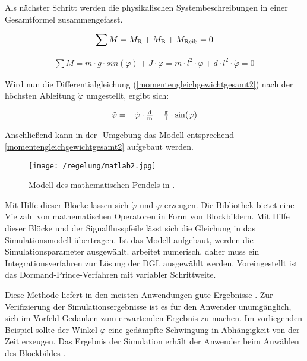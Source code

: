 Als nächster Schritt werden die physikalischen Systembeschreibungen in einer Gesamtformel zusammengefasst. 

\begin{align}
	\sum M = M_\i{R} + M_\i{B} + M_\i{Reib} = 0
	\label{momentengleichgewichtgesamt} 
\end{align}

\begin{align}
	\sum M = m \cdot g \cdot \si{sin}(\varphi) + J \cdot \varphi = m \cdot l^{2} \cdot \ddot\varphi + d \cdot l^{2} \cdot \dot\varphi = 0
	\label{momentengleichgewichtgesamt2} 
\end{align}

Wird nun die Differentialgleichung (\ref{momentengleichgewichtgesamt2}) nach der höchsten Ableitung $\ddot\varphi$ umgestellt, ergibt sich:

\begin{align}
	\ddot\varphi = -\dot\varphi \cdot \tfrac{\i{d}}{\i{m}} - \tfrac{\i{g}}{\i{l}} \cdot \si{sin}(\varphi)
	\label{diffgleichung} 
\end{align}


Anschließend kann in der -Umgebung das Modell entsprechend \ref{momentengleichgewichtgesamt2} aufgebaut werden.

\begin{figure}[h]
	\centering
	\texttt{[image: /regelung/matlab2.jpg]}
	\label{fig:matlab2}
	\caption{Modell des mathematischen Pendels in  .}
\end{figure}

Mit Hilfe dieser Blöcke lassen sich  $\dot{\varphi}$ und $\varphi$ erzeugen.
Die  Bibliothek bietet eine Vielzahl von mathematischen Operatoren in Form von Blockbildern.
Mit Hilfe dieser Blöcke und der Signalflusspfeile lässt sich die Gleichung in das Simulationsmodell übertragen.
Ist das Modell aufgebaut, werden die Simulationsparameter ausgewählt. 
 arbeitet numerisch, daher muss ein Integrationsverfahren zur Lösung der DGL ausgewählt werden. Voreingestellt ist das Dormand-Prince-Verfahren mit variabler Schrittweite.

Diese Methode liefert in den meisten Anwendungen gute Ergebnisse \autocite{scherf2010}.
Zur Verifizierung der Simulationsergebnisse ist es für den Anwender unumgänglich, sich im Vorfeld Gedanken zum erwartenden Ergebnis zu machen.
Im vorliegenden Beispiel sollte der Winkel $\varphi$ eine gedämpfte Schwingung in Abhängigkeit von der Zeit erzeugen.
Das Ergebnis der Simulation erhält der Anwender beim Anwählen des Blockbildes \grqq.

